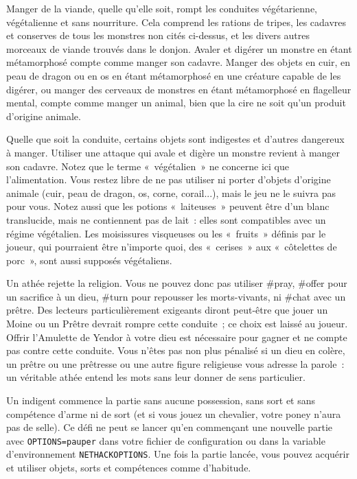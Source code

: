 \documentclass[titlepage]{article}
\begin{document}
Manger de la viande, quelle qu'elle soit, rompt les conduites végétarienne,
végétalienne et sans nourriture.
Cela comprend les rations de tripes, les cadavres et conserves de tous les
monstres non cités ci-dessus, et les divers autres morceaux de viande
trouvés dans le donjon.
Avaler et digérer un monstre en étant métamorphosé compte comme manger
son cadavre.
Manger des objets en cuir, en peau de dragon ou en os en étant
métamorphosé en une créature capable de les digérer, ou manger des
cerveaux de monstres en étant métamorphosé en flagelleur mental, compte
comme manger un animal, bien que la cire ne soit qu'un produit d'origine
animale.


Quelle que soit la conduite, certains objets sont indigestes et d'autres
dangereux à manger.
Utiliser une attaque qui avale et digère un monstre revient à manger son
cadavre.
Notez que le terme «~végétalien~» ne concerne ici que
l'alimentation.
Vous restez libre de ne pas utiliser ni porter d'objets d'origine animale
(cuir, peau de dragon, os, corne, corail...), mais le jeu ne le suivra pas
pour vous.
Notez aussi que les potions «~laiteuses~» peuvent être d'un blanc
translucide, mais ne contiennent pas de lait~: elles sont compatibles avec
un régime végétalien.
Les moisissures visqueuses ou les «~fruits~» définis par le joueur,
qui pourraient être n'importe quoi, des «~cerises~» aux
«~côtelettes de porc~», sont aussi supposés végétaliens.


Un athée rejette la religion.
Vous ne pouvez donc pas utiliser \#pray, \#offer pour un sacrifice à un
dieu, \#turn pour repousser les morts-vivants, ni \#chat avec un prêtre.
Des lecteurs particulièrement exigeants diront peut-être que jouer un
Moine ou un Prêtre devrait rompre cette conduite~; ce choix est laissé au
joueur.
Offrir l'Amulette de Yendor à votre dieu est nécessaire pour gagner et ne
compte pas contre cette conduite.
Vous n'êtes pas non plus pénalisé si un dieu en colère, un prêtre ou une
prêtresse ou une autre figure religieuse vous adresse la parole~: un
véritable athée entend les mots sans leur donner de sens particulier.


Un indigent commence la partie sans aucune possession, sans sort et sans
compétence d'arme ni de sort (et si vous jouez un chevalier, votre poney
n'aura pas de selle).
Ce défi ne peut se lancer qu'en commençant une nouvelle partie avec
\texttt{OPTIONS=pauper} dans votre fichier de configuration ou dans la
variable d'environnement \texttt{NETHACKOPTIONS}.
Une fois la partie lancée, vous pouvez acquérir et utiliser objets, sorts
et compétences comme d'habitude.
\end{document}
